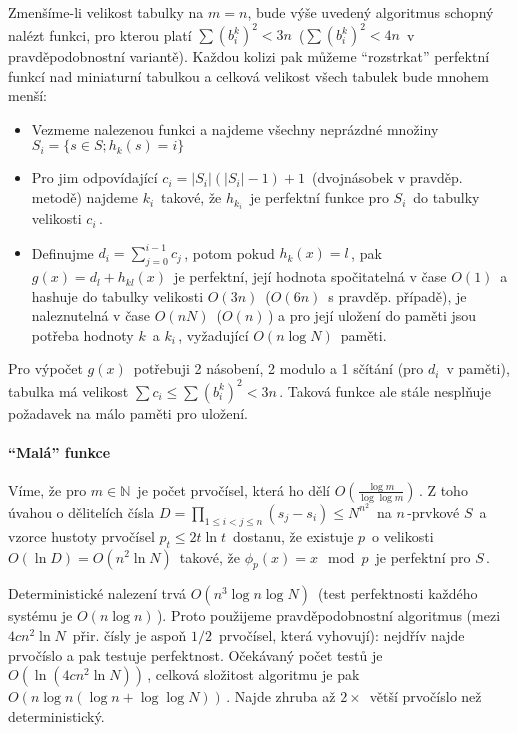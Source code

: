 Zmenšíme-li velikost tabulky na \(m = n\), bude výše uvedený algoritmus
schopný nalézt funkci, pro kterou platí \(\sum (b_i^k)^2 < 3n\,\!\)
(\(\sum (b_i^k)^2 < 4n\,\!\) v pravděpodobnostní variantě). Každou
kolizi pak můžeme ``rozstrkat'' perfektní funkcí nad miniaturní tabulkou
a celková velikost všech tabulek bude mnohem menší:

\begin{itemize}
\tightlist
\item
  Vezmeme nalezenou funkci a najdeme všechny neprázdné množiny
  \(S_i=\{s\in S;h_k(s)=i\}\,\!\)
\item
  Pro jim odpovídající \(c_i=|S_i|(|S_i|-1)+1\,\!\) (dvojnásobek v
  pravděp. metodě) najdeme \(k_i\,\!\) takové, že \(h_{k_i}\,\!\) je
  perfektní funkce pro \(S_i\,\!\) do tabulky velikosti \(c_i\,\!\).
\item
  Definujme \(d_i=\sum_{j=0}^{i-1}c_j\,\!\), potom pokud
  \(h_k(x)=l\,\!\), pak \(g(x)=d_l+h_{kl}(x)\,\!\) je perfektní, její
  hodnota spočitatelná v čase \(O(1)\,\!\) a hashuje do tabulky
  velikosti \(O(3n)\,\!\) (\(O(6n)\,\!\) s pravděp. případě), je
  naleznutelná v čase \(O(nN)\,\!\) (\(O(n)\,\!\)) a pro její uložení do
  paměti jsou potřeba hodnoty \(k\,\!\) a \(k_i\,\!\), vyžadující
  \(O(n\log N)\,\!\) paměti.
\end{itemize}

Pro výpočet \(g(x)\,\!\) potřebuji 2 násobení, 2 modulo a 1 sčítání (pro
\(d_i\,\!\) v paměti), tabulka má velikost
\(\sum c_i\leq\sum (b_i^k)^2<3n\,\!\). Taková funkce ale stále nesplňuje
požadavek na málo paměti pro uložení.

\paragraph{\texorpdfstring{``Malá''
funkce}{Malá funkce}}\label{maluxe1-funkce}

Víme, že pro \(m\in\mathbb{N}\,\!\) je počet prvočísel, která ho dělí
\(O(\frac{\log m}{\log\log m})\,\!\). Z toho úvahou o dělitelích čísla
\(D=\prod_{1\leq i<j\leq n}(s_j-s_i)\leq N^{n^2}\,\!\) na
\(n\,\!\)-prvkové \(S\,\!\) a vzorce hustoty prvočísel
\(p_t\leq 2t\ln t\,\!\) dostanu, že existuje \(p\,\!\) o velikosti
\(O(\ln D)=O(n^2\ln N)\,\!\) takové, že \(\phi_p(x)=x\mod p\,\!\) je
perfektní pro \(S\,\!\).

Deterministické nalezení trvá \(O(n^3\log n\log N)\,\!\) (test
perfektnosti každého systému je \(O(n\log n)\,\!\)). Proto použijeme
pravděpodobnostní algoritmus (mezi \(4cn^2\ln N\,\!\) přir. čísly je
aspoň \(1/2\,\!\) prvočísel, která vyhovují): nejdřív najde prvočíslo a
pak testuje perfektnost. Očekávaný počet testů je
\(O(\ln(4cn^2\ln N))\,\!\), celková složitost algoritmu je pak
\(O(n\log n(\log n+\log\log N))\,\!\). Najde zhruba až \(2\times\,\!\)
větší prvočíslo než deterministický.

